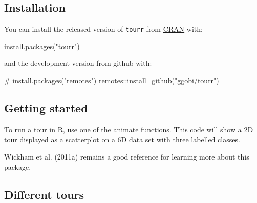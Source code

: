 \documentclass[
  letterpaper,
]{book}
\newenvironment{Shaded}{\begin{snugshade}}{\end{snugshade}}
\newcommand{\AttributeTok}[1]{\textcolor[rgb]{0.40,0.45,0.13}{#1}}
\newcommand{\CommentTok}[1]{\textcolor[rgb]{0.37,0.37,0.37}{#1}}
\newcommand{\DecValTok}[1]{\textcolor[rgb]{0.68,0.00,0.00}{#1}}
\newcommand{\FunctionTok}[1]{\textcolor[rgb]{0.28,0.35,0.67}{#1}}
\newcommand{\NormalTok}[1]{\textcolor[rgb]{0.00,0.23,0.31}{#1}}
\newcommand{\SpecialCharTok}[1]{\textcolor[rgb]{0.37,0.37,0.37}{#1}}
\newcommand{\StringTok}[1]{\textcolor[rgb]{0.13,0.47,0.30}{#1}}
\begin{document}
\hypertarget{installation}{%
\subsection{Installation}\label{installation}}

You can install the released version of \texttt{tourr} from
\href{https://CRAN.R-project.org}{CRAN} with:

\begin{Shaded}
\begin{Highlighting}[]
\FunctionTok{install.packages}\NormalTok{(}\StringTok{"tourr"}\NormalTok{)}
\end{Highlighting}
\end{Shaded}

and the development version from github with:

\begin{Shaded}
\begin{Highlighting}[]
\CommentTok{\# install.packages("remotes")}
\NormalTok{remotes}\SpecialCharTok{::}\FunctionTok{install\_github}\NormalTok{(}\StringTok{"ggobi/tourr"}\NormalTok{)}
\end{Highlighting}
\end{Shaded}

\hypertarget{getting-started}{%
\subsection{Getting started}\label{getting-started}}

To run a tour in R, use one of the animate functions. This code will
show a 2D tour displayed as a scatterplot on a 6D data set with three
labelled classes.

\begin{Shaded}
\end{Shaded}

Wickham et al. (2011a) remains a good reference for learning more about
this package.

\hypertarget{different-tours}{%
\subsection{Different tours}\label{different-tours}}
\end{document}
